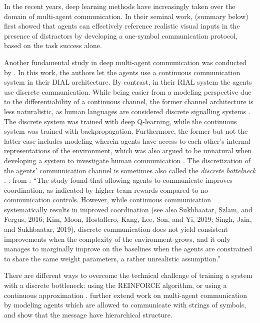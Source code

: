 In the recent years, deep learning methods have increasingly taken over the domain of multi-agent communication. 
In their seminal work, \cite{lazaridou2016multi} (summary below) first showed that agents can effectively reference realistic visual inputs in the presence of distractors by developing a one-symbol communication protocol, based on the task success alone.

Another fundamental study in deep multi-agent communication was conducted by \cite{foerster2016learning}. In this work, the authors let the agents use a continuous communication system in their DIAL architecture. By contrast, in their RIAL system the agents use discrete communication. While being easier from a modeling perspective due to the differentiability of a continuous channel, the former channel architecture is less naturalistic, as human languages are considered discrete signalling systems \parencite{hockett1960origin}. The discrete system was trained with deep Q-learning, while the continuous system was trained with backpropagation. Furthermore, the former but not the latter case includes modeling wherein agents have access to each other's internal representations of the environment, which was also argued to be unnatural when developing a system to investigate human communication . The discretization of the agents' communication channel is sometimes also called the \textit{discrete bottelneck} \parencite{lazaridou2020multi}. \parencite{foerster2016learning}: from \cite{lazaridou2020multi}: ``The study found that allowing agents to communicate improves coordination, as indicated by higher team rewards compared to no-communication controls. However, while continuous communication systematically results in improved coordination (see also Sukhbaatar, Szlam, and Fergus, 2016; Kim, Moon, Hostallero, Kang, Lee, Son, and Yi, 2019; Singh, Jain, and Sukhbaatar, 2019), discrete communication does not yield consistent improvements when the complexity of the environment grows, and it only manages to marginally improve on the baselines when the agents are constrained to share the same weight parameters, a rather unrealistic assumption.''

There are different ways to overcome the technical challenge of training a system with a discrete bottleneck: using the REINFORCE algorithm, or using a continuous approximation \cite{havrylov2017emergence}. \cite{havrylov2017emergence} further extend work on multi-agent communication by modeling agents which are allowed to communicate with strings of symbols, and show that the message have hierarchical structure.
 

